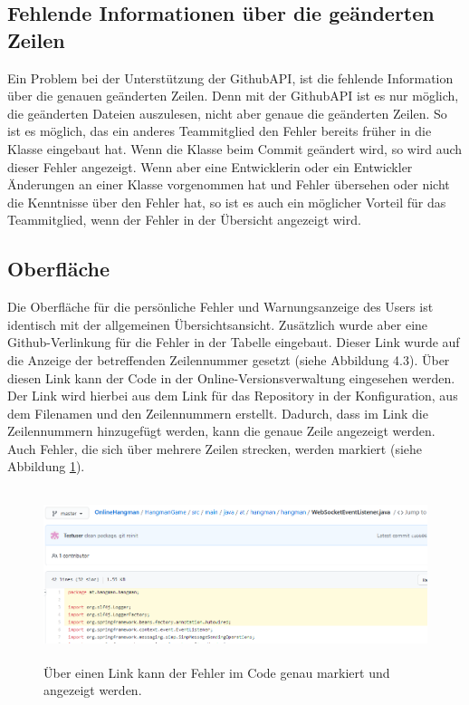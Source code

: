 \subsection{Fehlende Informationen über die geänderten Zeilen}
Ein Problem bei der Unterstützung der GithubAPI, ist die fehlende Information über die genauen geänderten Zeilen. Denn mit der GithubAPI ist es nur möglich, die geänderten Dateien auszulesen, nicht aber genaue die geänderten Zeilen. So ist es möglich, das ein anderes Teammitglied den Fehler bereits früher in die Klasse eingebaut hat. Wenn die Klasse beim Commit geändert wird, so wird auch dieser Fehler angezeigt. Wenn aber eine Entwicklerin oder ein Entwickler Änderungen an einer Klasse vorgenommen hat und Fehler übersehen oder nicht die Kenntnisse über den Fehler hat, so ist es auch ein möglicher Vorteil für das Teammitglied, wenn der Fehler in der Übersicht angezeigt wird. 
\subsection{Oberfläche}
Die Oberfläche für die persönliche Fehler und Warnungsanzeige des Users ist identisch mit der allgemeinen Übersichtsansicht. Zusätzlich wurde aber eine Github-Verlinkung für die Fehler in der Tabelle eingebaut. Dieser Link wurde auf die Anzeige der betreffenden Zeilennummer gesetzt (siehe Abbildung 4.3). Über diesen Link kann der Code in der Online-Versionsverwaltung eingesehen werden. Der Link wird hierbei aus dem Link für das Repository in der Konfiguration, aus dem Filenamen und den Zeilennummern erstellt. Dadurch, dass im Link die Zeilennummern hinzugefügt werden, kann die genaue Zeile angezeigt werden. Auch Fehler, die sich über mehrere Zeilen strecken, werden markiert (siehe Abbildung \ref{fig:markedFindings}). 
\begin{figure}[tp]
  \centering
  \includegraphics[height=5cm]{images/markedFindings.PNG}
 \caption[Anzeige der markierten Fehler]{Über einen Link kann der Fehler im Code genau markiert und angezeigt werden.}
  \label{fig:markedFindings}
\end{figure}
